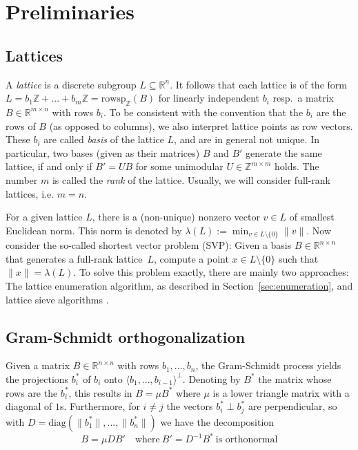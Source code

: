 \documentclass{scrartcl}
\newcommand{\Z}{\mathbb{Z}}
\newcommand{\R}{\mathbb{R}}
\begin{document}
    \section{Preliminaries}

    \subsection{Lattices}

    A \emph{lattice} is a discrete subgroup $L \subseteq \R^n$. 
    It follows that each lattice is of the form $L = b_1 \Z + ... + b_m \Z = \mathrm{rowsp}_{\Z}(B)$ for linearly independent $b_i$ resp.\ a matrix $B \in \R^{m \times n}$ with rows $b_i$.
    To be consistent with the convention that the $b_i$ are the rows of $B$ (as opposed to columns), we also interpret lattice points as row vectors. 
    These $b_i$ are called \emph{basis} of the lattice $L$, and are in general not unique. 
    In particular, two bases (given as their matrices) $B$ and $B'$ generate the same lattice, if and only if $B' = UB$ for some unimodular $U \in \Z^{m \times m}$ holds.
    The number $m$ is called the \emph{rank} of the lattice. Usually, we will consider full-rank lattices, i.e. $m = n$.

    For a given lattice $L$, there is a (non-unique) nonzero vector $v \in L$ of smallest Euclidean norm. This norm is denoted by $\lambda(L) := \min_{v \in L \setminus \{0\}} \| v \|$. 
    Now consider the so-called shortest vector problem (SVP): Given a basis $B \in \R^{n \times n}$ that generates a full-rank lattice~$L$, compute a point $x \in L \setminus \{0\}$ such that $\| x \| = \lambda(L)$. 
    To solve this problem exactly, there are mainly two approaches: The lattice enumeration algorithm, as described in Section~\ref{sec:enumeration}, and lattice sieve algorithms \cite{sieve, g6k}.

    \subsection{Gram-Schmidt orthogonalization}

    Given a matrix $B \in \R^{n \times n}$ with rows $b_1, ..., b_n$, the Gram-Schmidt process yields the projections $b^*_i$ of $b_i$ onto $\langle b_1, ..., b_{i - 1} \rangle ^ \perp$. 
    Denoting by $B^*$ the matrix whose rows are the $b^*_i$, this results in $B = \mu B^*$ where $\mu$ is a lower triangle matrix with a diagonal of $1$s. 
    Furthermore, for $i \neq j$ the vectors $b^*_i \perp b^*_j$ are perpendicular, so with $D = \mathrm{diag}( \|b^*_1\|, ..., \|b^*_n\| )$ we have the decomposition
    \begin{equation*}
        B = \mu D B' \quad \text{where} \ B' = D^{-1} B^* \ \text{is orthonormal}
    \end{equation*}
\end{document}
